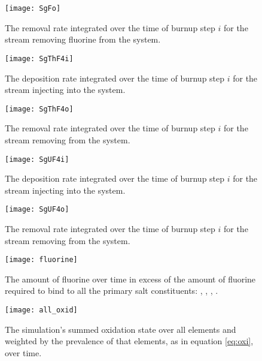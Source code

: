 \begin{figure}[H]
    \centering
    \texttt{[image: SgFo]}
    \caption{The removal rate integrated over the time of burnup step $i$
    for the stream removing fluorine from the system.}
    \label{fig:SgFo}
\end{figure}

\begin{figure}[H]
    \centering
    \texttt{[image: SgThF4i]}
    \caption{The deposition rate integrated over the time of burnup step $i$
    for the stream injecting  into the system.}
    \label{fig:SgThF4i}
\end{figure}

\begin{figure}[H]
    \centering
    \texttt{[image: SgThF4o]}
    \caption{The removal rate integrated over the time of burnup step $i$
    for the stream removing  from the system.}
    \label{fig:SgThF4o}
\end{figure}

\begin{figure}[H]
    \centering
    \texttt{[image: SgUF4i]}
    \caption{The deposition rate integrated over the time of burnup step $i$
    for the stream injecting  into the system.}
    \label{fig:SgUF4i}
\end{figure}

\begin{figure}[H]
    \centering
    \texttt{[image: SgUF4o]}
    \caption{The removal rate integrated over the time of burnup step $i$
    for the stream removing  from the system.}
    \label{fig:SgUF4o}
\end{figure}

\begin{figure}[H]
    \centering
    \texttt{[image: fluorine]}
    \caption{The amount of fluorine over time in excess of the amount of 
    fluorine required to bind to all the primary salt constituents: 
    , , , .}
    \label{fig:fluorine}
\end{figure}

\begin{figure}[H]
    \centering
    \texttt{[image: all\_oxid]}
    \caption{The simulation's summed oxidation state over all elements and
    weighted by the prevalence of that elements, as in equation \ref{eq:oxi},
    over time.}
    \label{fig:all_oxid}
\end{figure}

